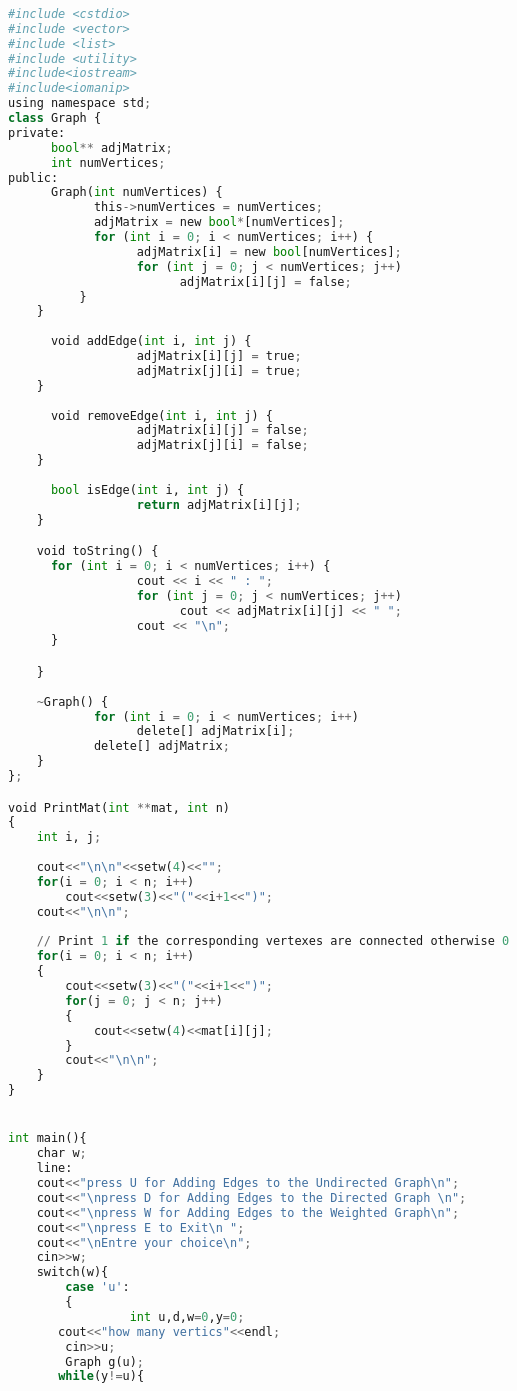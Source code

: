 \documentclass[11pt]{article}            %
\begin{document}
\begin{lstlisting}[language=Python]
 
#include <cstdio>
#include <vector>
#include <list>
#include <utility>
#include<iostream>
#include<iomanip>
using namespace std;
class Graph {
private:
      bool** adjMatrix;
      int numVertices;
public:
      Graph(int numVertices) {
            this->numVertices = numVertices;
            adjMatrix = new bool*[numVertices];
            for (int i = 0; i < numVertices; i++) {
                  adjMatrix[i] = new bool[numVertices];
                  for (int j = 0; j < numVertices; j++)
                        adjMatrix[i][j] = false;
          }
    }
 
      void addEdge(int i, int j) {
                  adjMatrix[i][j] = true;
                  adjMatrix[j][i] = true;
    }
 
      void removeEdge(int i, int j) {
                  adjMatrix[i][j] = false;
                  adjMatrix[j][i] = false;
    }
 
      bool isEdge(int i, int j) {
                  return adjMatrix[i][j];
    }

    void toString() {
      for (int i = 0; i < numVertices; i++) {
                  cout << i << " : ";
                  for (int j = 0; j < numVertices; j++)
                        cout << adjMatrix[i][j] << " ";
                  cout << "\n";
      }

    }
 
    ~Graph() {
            for (int i = 0; i < numVertices; i++)
                  delete[] adjMatrix[i];
            delete[] adjMatrix;
    }
};

void PrintMat(int **mat, int n)
{
	int i, j;
 
	cout<<"\n\n"<<setw(4)<<"";
	for(i = 0; i < n; i++)
		cout<<setw(3)<<"("<<i+1<<")";
	cout<<"\n\n";
 
	// Print 1 if the corresponding vertexes are connected otherwise 0.
	for(i = 0; i < n; i++)
	{
		cout<<setw(3)<<"("<<i+1<<")";
		for(j = 0; j < n; j++)
		{
			cout<<setw(4)<<mat[i][j];
		}
		cout<<"\n\n";
	}
}


int main(){
	char w;
	line:
	cout<<"press U for Adding Edges to the Undirected Graph\n";
	cout<<"\npress D for Adding Edges to the Directed Graph \n";
	cout<<"\npress W for Adding Edges to the Weighted Graph\n";
	cout<<"\npress E to Exit\n ";
	cout<<"\nEntre your choice\n";
	cin>>w;
	switch(w){
		case 'u':
		{
			 	 int u,d,w=0,y=0;
       cout<<"how many vertics"<<endl;
       	cin>>u;
       	Graph g(u);
	   while(y!=u){
       	

\end{lstlisting}
\end{document}
